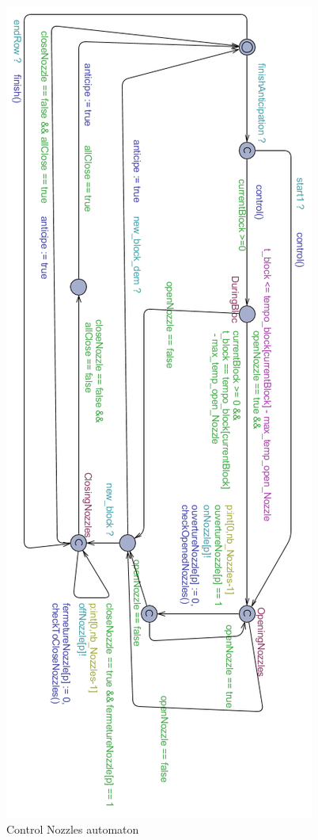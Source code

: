 \begin{figure}[h!] 
	\begin{center}
		\includegraphics[scale = 0.7]{ControlBuse.png}
		\caption{Control Nozzles automaton} 
		\label{fig:CtrNozzle}
	\end{center}
\end{figure}

